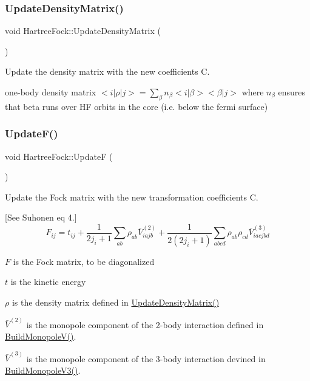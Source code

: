 \subsubsection{\texorpdfstring{Update\+Density\+Matrix()}{UpdateDensityMatrix()}}
{\footnotesize\ttfamily void Hartree\+Fock\+::\+Update\+Density\+Matrix (\begin{DoxyParamCaption}{ }\end{DoxyParamCaption})}



Update the density matrix with the new coefficients C. 

one-\/body density matrix $ <i|\rho|j> = \sum\limits_{\beta} n_{\beta} <i|\beta> <\beta|j> $ where $n_{\beta} $ ensures that beta runs over HF orbits in the core (i.\+e. below the fermi surface) \mbox{\label{classHartreeFock_a84fe0eb16f6e5835c920bf8fa98c4442}} 
\subsubsection{\texorpdfstring{Update\+F()}{UpdateF()}}
{\footnotesize\ttfamily void Hartree\+Fock\+::\+UpdateF (\begin{DoxyParamCaption}{ }\end{DoxyParamCaption})}



Update the Fock matrix with the new transformation coefficients C. 

\mbox{[}See Suhonen eq 4.\mbox{]} \[ F_{ij} = t_{ij} + \frac{1}{2j_i+1}\sum_{ab} \rho_{ab} \bar{V}^{(2)}_{iajb} + \frac{1}{2(2j_i+1)}\sum_{abcd}\rho_{ab} \rho_{cd} \bar{V}^{(3)}_{iacjbd} \]
\begin{DoxyItemize}
\item $ F $ is the Fock matrix, to be diagonalized
\item $ t $ is the kinetic energy
\item $\rho$ is the density matrix defined in \hyperlink{classHartreeFock_aad38c905e7e9f9e9757b5800e6910c61}{Update\+Density\+Matrix()}
\item $ \bar{V}^{(2)} $ is the monopole component of the 2-\/body interaction defined in \hyperlink{classHartreeFock_a3d6bac9b4403e4bc599a89ad0c9b6056}{Build\+Monopole\+V()}.
\item $ \bar{V}^{(3)} $ is the monopole component of the 3-\/body interaction devined in \hyperlink{classHartreeFock_a1c146af25a09f427cc626d877ec6e518}{Build\+Monopole\+V3()}. 
\end{DoxyItemize}\mbox{\label{classHartreeFock_ab863d5d020e15854d4d591ec0ce6a1a0}} 
